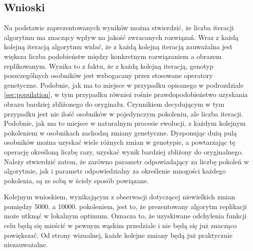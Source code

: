 \subsection{Wnioski}
Na podstawie zaprezentowanych wyników można stwierdzić, że liczba iteracji algorytmu ma znaczący wpływ na jakość zwracanych rozwiązań. Wraz z każdą kolejną iteracją algorytmu widać, że z każdą kolejną iteracją zauważalna jest większa liczba podobieństw między konkretnym rozwiązaniem a obrazem replikowanym. Wynika to z faktu, że z każdą kolejną iteracją, genotyp poszczególnych osobników jest wzbogacany przez stosowane operatory genetyczne. Podobnie, jak ma to miejsce w przypadku opisanego w podrozdziale \ref{sec:population}, w tym przypadku również rośnie prawdopodobieństwo uzyskania obrazu bardziej zbliżonego do oryginału. Czynnikiem decydującym w tym przypadku jest nie ilość osobników w pojedynczym pokoleniu, ale liczba iteracji. Podobnie, jak ma to miejsce w naturalnym procesie ewolucji, z każdym kolejnym pokoleniem w osobnikach zachodzą zmiany genetyczne. Dysponując dużą pulą osobników można uzyskać wiele różnych zmian w genotypie, a powtarzając tę operację określoną liczbę razy, uzyskać wynik bardziej zbliżony do oryginalnego. Należy stwierdzić zatem, że zarówno parametr odpowiadający za liczbę pokoleń w algorytmie, jak i parametr odpowiedzialny za określenie mnogości każdego pokolenia, są ze sobą w ścisły sposób powiązane. 

Kolejnym wnioskiem, wynikającym z obserwacji dotyczącej niewielkich zmian pomiędzy 5000. a 10000. pokoleniem, jest to, że prezentowany algorytm replikacji może utknąć w lokalnym optimum. Oznacza to, że uzyskiwane odchylenia funkcji celu będą się mieścić w pewnym wąskim przedziale i nie będą się już znacząco powiększać. Od strony wizualnej, każde kolejne zmiany będą już praktycznie niezauważalne.

